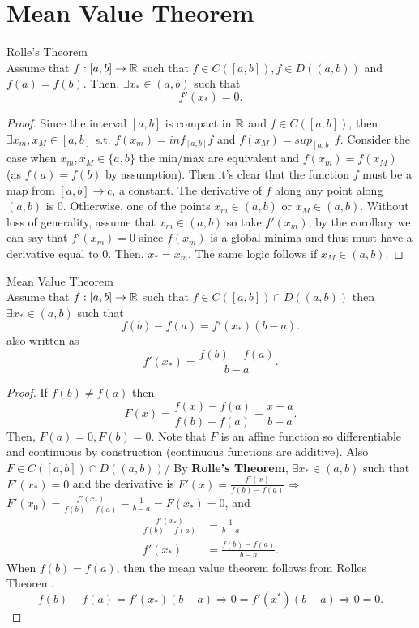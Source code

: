 \documentclass[a4paper]{article}
\begin{document}
\section{Mean Value Theorem}

\begin{theorem}{Rolle's Theorem} \\
  Assume that $f:[a,b] \to \mathbb{R}$ such that $f \in C\left( [a,b] \right), f \in D((a,b)) $ and $f(a) = f(b)$. Then, $\exists x_{*} \in (a,b)$ such that
   \[
   f'(x_{*}) = 0
   .\] 

  \noindent\hrulefill
  
  \begin{proof}
    Since the interval $[a,b] $ is compact in $\mathbb{R}$ and  $f \in C([a,b])$, then $\exists x_m, x_M \in [a,b]$ s.t. $f(x_m) = inf_{[a,b]} f$ and $f(x_M) = sup_{[a,b]} f$. Consider the case when $x_m, x_M \in \{a,b\}$ the min/max are equivalent and $f(x_m) = f(x_M)$ (as  $f(a) = f(b)$ by assumption). Then it's clear that the function  $f$ must be a map from  $[a,b] \to c$, a constant. The derivative of $f$ along any point along  $(a,b)$ is 0. Otherwise, one of the points $x_m \in (a,b)$ or  $x_M \in (a,b)$. Without loss of generality, assume that  $x_m \in (a,b)$ so take  $f'(x_m)$, by the corollary we can say that  $f'(x_m) = 0$ since $f(x_m)$ is a global minima and thus must have a derivative equal to 0. Then, $x_{*} = x_m$. The same logic follows if  $x_M \in (a,b)$. \end{proof}
\end{theorem}

\begin{theorem}{Mean Value Theorem}\\
  Assume that $f:[a,b] \to \mathbb{R}$ such that $f \in C([a,b]) \cap D((a,b))$ then $\exists x_{*} \in (a,b)$ such that
   \[
   f(b) - f(a) = f'(x_{*}) (b-a) 
   .\] 
   also written as
   \[
   f'(x_{*}) = \frac{f(b) - f(a)}{b - a}
   .\] 

   \noindent\hrulefill

   \begin{proof}
     If $f(b) \neq f(a)$ then 
      \[
     F(x) = \frac{f(x) - f(a)}{ f(b) - f(a)} - \frac{x - a}{ b - a}
     .\]  
     Then, $F(a) = 0, F(b) = 0$. Note that $F$ is an affine function so differentiable and continuous by construction (continuous functions are additive). Also $F \in C([a,b]) \cap D((a,b))$/ By \textbf{Rolle's Theorem}, $\exists x_{*} \in (a,b)$ such that $F'(x_{*}) = 0$ and the derivative is $F'(x) = \frac{f'(x)}{f(b) - f(a)} \Rightarrow$ $F'(x_0) = \frac{f'(x_{*})}{f(b) - f(a)} - \frac{1}{b-a} = F(x_{*}) = 0$, and
     \begin{align*}
       \frac{f'(x_{*})}{f(b)-f(a)} &= \frac{1}{b-a} \\
       f'(x_{*}) &= \frac{f(b) - f(a)}{ b- a}
     .\end{align*}
    When $f(b) = f(a)$, then the mean value theorem follows from Rolles Theorem. 
    \[
   f(b) - f(a) = f'(x_{*}) (b-a) \Rightarrow 0 = f'(x^{*}) (b-a) \Rightarrow 0 = 0
   .\] 
   \end{proof}
\end{theorem}
\end{document}
